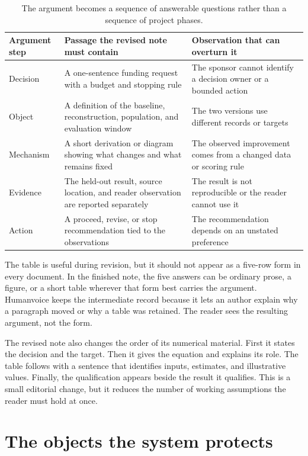 \begin{table}[H]
\centering
\small
\begin{tabularx}{\textwidth}{@{}p{}L p{0.26\textwidth}@{}}
\toprule
Argument step & Passage the revised note must contain & Observation that can
overturn it \\
\midrule
Decision & A one-sentence funding request with a budget and stopping
rule & The sponsor cannot identify a decision owner or a bounded action \\
Object & A definition of the baseline, reconstruction, population, and
evaluation window & The two versions use different records or targets \\
Mechanism & A short derivation or diagram showing what changes and what remains
fixed & The observed improvement comes from a changed data or scoring rule \\
Evidence & The held-out result, source location, and reader observation are
reported separately & The result is not reproducible or the reader cannot use it \\
Action & A proceed, revise, or stop recommendation tied to the observations &
The recommendation depends on an unstated preference \\
\bottomrule
\end{tabularx}
\caption{The argument becomes a sequence of answerable questions rather than a
sequence of project phases.}
\label{tab:case-argument}
\end{table}

The table is useful during revision, but it should not appear as a five-row
form in every document. In the finished note, the five answers can be ordinary
prose, a figure, or a short table wherever that form best carries the argument.
Humanvoice keeps the intermediate record because it lets an author explain why
a paragraph moved or why a table was retained. The reader sees the resulting
argument, not the form.

The revised note also changes the order of its numerical material. First it
states the decision and the target. Then it gives the equation and explains its
role. The table follows with a sentence that identifies inputs, estimates, and
illustrative values. Finally, the qualification appears beside the result it
qualifies. This is a small editorial change, but it reduces the number of
working assumptions the reader must hold at once.

\section{The objects the system protects}
\label{sec:case-protected}

